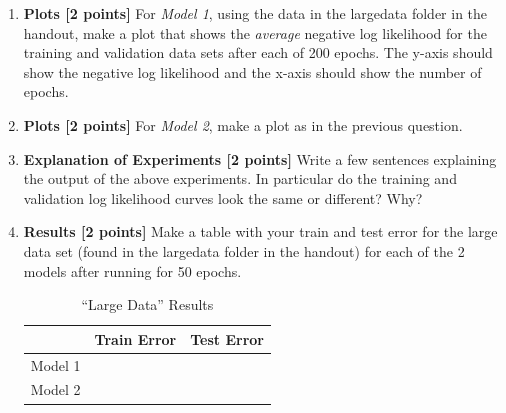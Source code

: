 \documentclass[11pt]{article}
\numberwithin{equation}{section} %
\numberwithin{figure}{section} %
\numberwithin{table}{section} %
\begin{document}
\begin{enumerate}
    
\item {\bf Plots [2 points]} 
For \emph{Model 1}, using the data in the largedata folder in the handout, make a plot that shows the \textit{average} negative log likelihood for the training and validation data sets after each of 200 epochs. The y-axis should show the negative log likelihood and the x-axis should show the number of epochs.  

\begin{solution}
    \bigskip \bigskip \bigskip \bigskip \bigskip \bigskip \bigskip \bigskip
    \bigskip \bigskip \bigskip \bigskip \bigskip \bigskip \bigskip \bigskip
\end{solution}

\item {\bf Plots [2 points]} 
For \emph{Model 2}, make a plot as in the previous question.
        
\begin{solution}
    \bigskip \bigskip \bigskip \bigskip \bigskip \bigskip \bigskip \bigskip
    \bigskip \bigskip \bigskip \bigskip \bigskip \bigskip \bigskip \bigskip
    \bigskip \bigskip \bigskip \bigskip \bigskip \bigskip \bigskip \bigskip
\end{solution}
\clearpage


\item {\bf Explanation of Experiments [2 points]}
Write a few sentences explaining the output of the above experiments. In particular do the training and validation log likelihood curves look the same or different? Why?

\begin{solution}
    \bigskip \bigskip \bigskip \bigskip \bigskip \bigskip \bigskip \bigskip
    \bigskip \bigskip \bigskip \bigskip \bigskip \bigskip \bigskip \bigskip
\end{solution}

\item {\bf Results [2 points]} 
Make a table with your train and test error for the large data set (found in the largedata folder in the handout) for each of the 2 models after running for 50 epochs.

\begin{solution}
     \begin{table}[H]
        \centering
        \begin{tabular}{l|l|l}
        \toprule
        & Train Error & Test Error \\ 
        \midrule
        Model 1      &         &         \\ 
        Model 2 &         &         \\ 
        \bottomrule
        \end{tabular}
        \caption{``Large Data'' Results}
        \label{results}
    \end{table}
\end{solution}



\end{enumerate}
\end{document}
